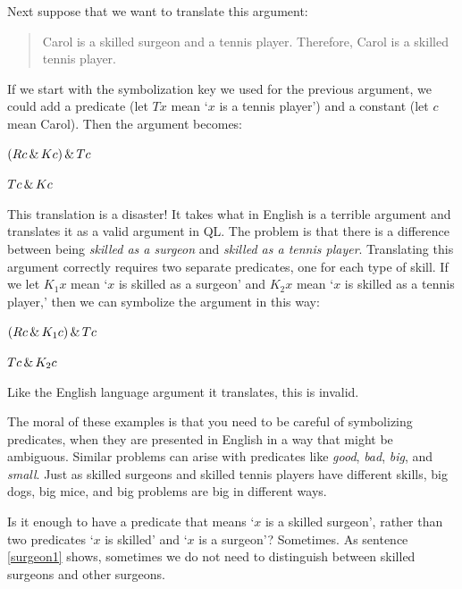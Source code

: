 Next suppose that we want to translate this argument:
\begin{quote}
\label{surgeon3}
Carol is a skilled surgeon and a tennis player. Therefore, Carol is a skilled tennis player.
\end{quote}
If we start with the symbolization key we used for the previous argument, we could add a predicate (let $Tx$ mean `$x$ is a tennis player') and a constant (let $c$ mean Carol). Then the argument becomes:
\begin{earg}
\item[] $(Rc \,\&\, Kc) \,\&\, Tc$
\item[\therefore] $Tc \,\&\, Kc$
\end{earg}
This translation is a disaster! It takes what in English is a terrible argument and translates it as a valid argument in QL. The problem is that there is a difference between being \emph{skilled as a surgeon} and \emph{skilled as a tennis player}. Translating this argument correctly requires two separate predicates, one for each type of skill. If we let $K_1x$ mean `$x$ is skilled as a surgeon' and $K_2x$ mean `$x$ is skilled as a tennis player,' then we can symbolize the argument in this way:
\begin{earg}
\label{surgeon3correct}
\item[] $(Rc \,\&\, K_1c) \,\&\, Tc$
\item[\therefore] $Tc \,\&\, K_2c$
\end{earg}
Like the English language argument it translates, this is invalid. %

The moral of these examples is that you need to be careful of symbolizing predicates, when they are presented in English in a way that might be ambiguous. Similar problems can arise with predicates like \emph{good}, \emph{bad}, \emph{big}, and \emph{small}. Just as skilled surgeons and skilled tennis players have different skills, big dogs, big mice, and big problems are big in different ways.

Is it enough to have a predicate that means `$x$ is a skilled surgeon', rather than two predicates `$x$ is skilled' and `$x$ is a surgeon'? Sometimes. As sentence \ref{surgeon1} shows, sometimes we do not need to distinguish between skilled surgeons and other surgeons.

